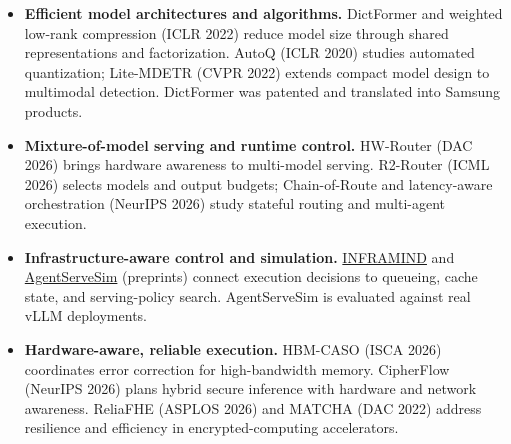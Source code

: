 \begin{itemize}
\item \textbf{Efficient model architectures and algorithms.} DictFormer and weighted low-rank compression (ICLR 2022) reduce model size through shared representations and factorization. AutoQ (ICLR 2020) studies automated quantization; Lite-MDETR (CVPR 2022) extends compact model design to multimodal detection. DictFormer was patented and translated into Samsung products.
\item \textbf{Mixture-of-model serving and runtime control.} HW-Router (DAC 2026) brings hardware awareness to multi-model serving. R2-Router (ICML 2026) selects models and output budgets; Chain-of-Route and latency-aware orchestration (NeurIPS 2026) study stateful routing and multi-agent execution.
\item \textbf{Infrastructure-aware control and simulation.} \href{https://arxiv.org/pdf/2606.11440}{INFRAMIND} and \href{https://arxiv.org/pdf/2606.09613}{AgentServeSim} (preprints) connect execution decisions to queueing, cache state, and serving-policy search. AgentServeSim is evaluated against real vLLM deployments.
\item \textbf{Hardware-aware, reliable execution.} HBM-CASO (ISCA 2026) coordinates error correction for high-bandwidth memory. CipherFlow (NeurIPS 2026) plans hybrid secure inference with hardware and network awareness. ReliaFHE (ASPLOS 2026) and MATCHA (DAC 2022) address resilience and efficiency in encrypted-computing accelerators.
\end{itemize}
